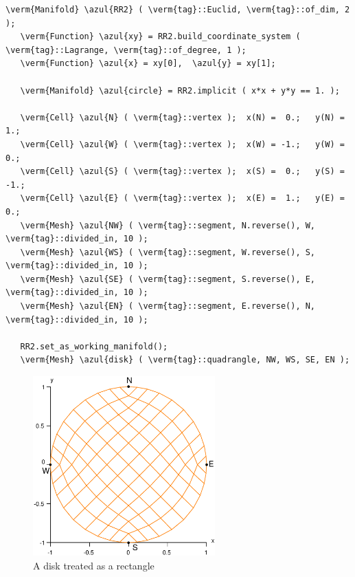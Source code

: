 \begin{Verbatim}[commandchars=\\\{\},formatcom=\small\tt,frame=single,
   label=parag-\ref{\numb section 2.\numb parag 8}.cpp,rulecolor=\color{coment},
   baselinestretch=0.94,framesep=2mm]
   \verm{Manifold} \azul{RR2} ( \verm{tag}::Euclid, \verm{tag}::of_dim, 2 );
   \verm{Function} \azul{xy} = RR2.build_coordinate_system ( \verm{tag}::Lagrange, \verm{tag}::of_degree, 1 );
   \verm{Function} \azul{x} = xy[0],  \azul{y} = xy[1];
   
   \verm{Manifold} \azul{circle} = RR2.implicit ( x*x + y*y == 1. );
   
   \verm{Cell} \azul{N} ( \verm{tag}::vertex );  x(N) =  0.;   y(N) =  1.;
   \verm{Cell} \azul{W} ( \verm{tag}::vertex );  x(W) = -1.;   y(W) =  0.;
   \verm{Cell} \azul{S} ( \verm{tag}::vertex );  x(S) =  0.;   y(S) = -1.;
   \verm{Cell} \azul{E} ( \verm{tag}::vertex );  x(E) =  1.;   y(E) =  0.;
   \verm{Mesh} \azul{NW} ( \verm{tag}::segment, N.reverse(), W, \verm{tag}::divided_in, 10 );
   \verm{Mesh} \azul{WS} ( \verm{tag}::segment, W.reverse(), S, \verm{tag}::divided_in, 10 );
   \verm{Mesh} \azul{SE} ( \verm{tag}::segment, S.reverse(), E, \verm{tag}::divided_in, 10 );
   \verm{Mesh} \azul{EN} ( \verm{tag}::segment, E.reverse(), N, \verm{tag}::divided_in, 10 );
   
   RR2.set_as_working_manifold();
   \verm{Mesh} \azul{disk} ( \verm{tag}::quadrangle, NW, WS, SE, EN );
\end{Verbatim}

\begin{figure} \centering
  \includegraphics[width=70mm]{disk}
  \caption{A disk treated as a rectangle}
  \label{\numb section 2.\numb fig 8}
\end{figure}


